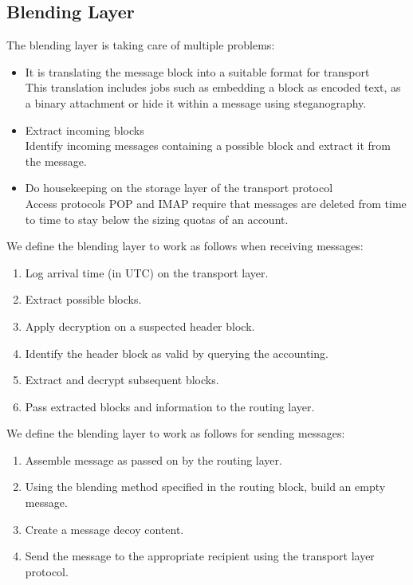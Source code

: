 \subsection{Blending Layer\label{sec:blending}}
The blending layer is taking care of multiple problems:
\begin{itemize}
	\item It is translating the message block into a suitable format for transport\\
	This translation includes jobs such as embedding a block as encoded text, as a binary attachment or hide it within a message using steganography.
	\item Extract incoming blocks\\
	Identify incoming messages containing a possible block and extract it from the message.
	\item Do housekeeping on the storage layer of the transport protocol\\
	Access protocols POP and IMAP require that messages are deleted from time to time to stay below the sizing quotas of an account.      
\end{itemize}

We define the blending layer to work as follows when receiving messages:

\begin{enumerate}
	\item Log arrival time (in UTC) on the transport layer.
	\item Extract possible blocks.
	\item Apply decryption on a suspected header block.
	\item Identify the header block as valid by querying the accounting.
	\item Extract and decrypt subsequent blocks.
	\item Pass extracted blocks and information to the routing layer.
\end{enumerate}

We define the blending layer to work as follows for sending messages:

\begin{enumerate}
	\item Assemble message as passed on by the routing layer.
	\item Using the blending method specified in the routing block, build an empty message. 
	\item Create a message decoy content.
	\item Send the message to the appropriate recipient using the transport layer protocol.
\end{enumerate}

